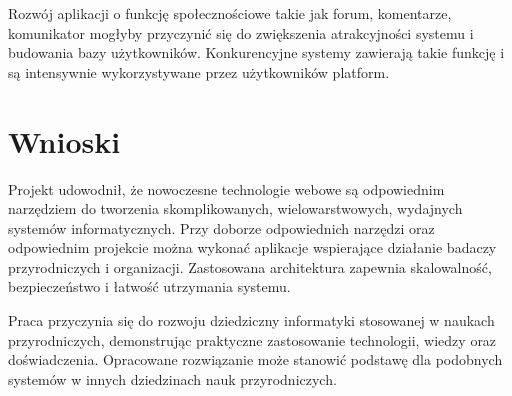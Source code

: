 Rozwój aplikacji o funkcję społecznościowe takie jak forum, komentarze, komunikator mogłyby przyczynić się do zwiększenia atrakcyjności systemu i budowania bazy użytkowników. Konkurencyjne systemy zawierają takie funkcję i są intensywnie wykorzystywane przez użytkowników platform.

\section*{Wnioski}
Projekt udowodnił, że nowoczesne technologie webowe są odpowiednim narzędziem do tworzenia skomplikowanych, wielowarstwowych, wydajnych systemów informatycznych. Przy doborze odpowiednich narzędzi oraz odpowiednim projekcie można wykonać aplikacje wspierające działanie badaczy przyrodniczych i organizacji. Zastosowana architektura zapewnia skalowalność, bezpieczeństwo i łatwość utrzymania systemu.

Praca przyczynia się do rozwoju dziedziczny informatyki stosowanej w naukach przyrodniczych, demonstrując praktyczne zastosowanie technologii, wiedzy oraz doświadczenia. Opracowane rozwiązanie może stanowić podstawę dla podobnych systemów w innych dziedzinach nauk przyrodniczych.

